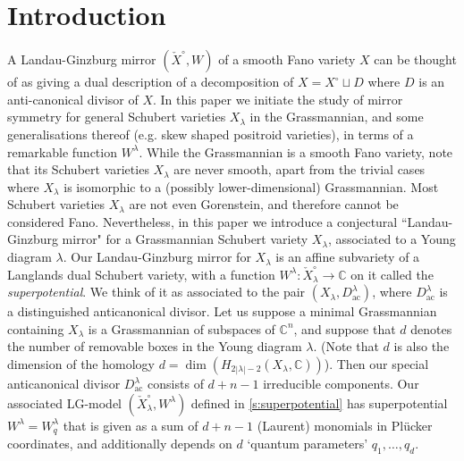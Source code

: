 \documentclass{amsart}
\theoremstyle{definition}
\numberwithin{equation}{section}
\newcommand{\C}{\mathbb{C}}
\newcommand{\Dac}{D_{\operatorname{ac}}}
\begin{document}
\section{Introduction}


A Landau-Ginzburg mirror $(\check X^\circ, W)$ of a smooth Fano variety $X$ can be thought 
of as giving a dual description of a decomposition of $X=X^\circ\sqcup D$ where $D$ is an anti-canonical divisor of $X$. 
In this paper we initiate the study of mirror symmetry for general Schubert varieties $X_\lambda$ in the Grassmannian, and some generalisations thereof (e.g. skew shaped positroid varieties), in terms of a remarkable function $W^\lambda$. 
While the Grassmannian is a smooth Fano variety, note that its Schubert varieties $X_\lambda$ are 
never smooth, apart from the trivial cases where  $X_\lambda$ is isomorphic 
to a (possibly lower-dimensional) Grassmannian. 
Most Schubert varieties $X_\lambda$ are not even Gorenstein, and therefore cannot be considered Fano.  
Nevertheless, in this paper we introduce a conjectural 
``Landau-Ginzburg mirror" for a Grassmannian Schubert
variety $X_{\lambda}$,
 associated to a Young diagram  $\lambda$.  
Our Landau-Ginzburg mirror for $X_\lambda$ is an affine subvariety of a Langlands dual Schubert variety, with a function  
$W^\lambda:\check X_{\lambda}^\circ\to\C$ on it called the \emph{superpotential}. 
We think of it as associated to the pair $(X_{\lambda},\Dac^{\lambda})$, where 
$\Dac^{\lambda}$ is a distinguished anticanonical divisor. Let us suppose a minimal Grassmannian containing  $X_\lambda$ is a
Grassmannian of subspaces of $\C^n$, and suppose that $d$ denotes the number of removable boxes in the Young diagram $\lambda$. (Note that $d$ is also  the dimension of the homology $d=\dim(H_{2|\lambda|-2}(X_\lambda,\C))$). Then our special anticanonical divisor
$\Dac^\lambda$ consists of $d+n-1$ irreducible components. 
Our associated LG-model $(\check X_\lambda^\circ, W^\lambda)$ defined in \cref{s:superpotential} has superpotential $W^\lambda=W^\lambda_q$ that is given as a sum of $d+n-1$ (Laurent) monomials in Pl\"ucker coordinates, and additionally depends on $d$ `quantum parameters' $q_1,\dotsc, q_d$. 
\end{document}
